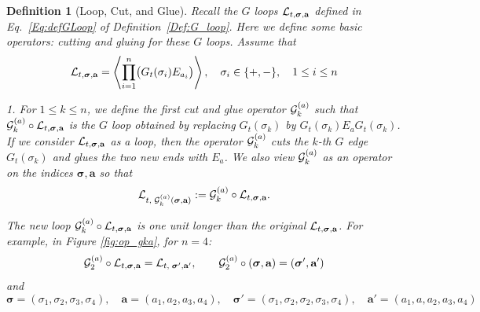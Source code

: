 \documentclass[10pt,reqno]{article}
\theoremstyle{plain} %
\newtheorem{definition}[theorem]{Definition}
\theoremstyle{remark}
\numberwithin{equation}{section}
\begin{document}
 

\begin{definition}[Loop, Cut, and Glue]\label{Def:oper_loop}
Recall the $G$ loops ${\cal L}_{t, \boldsymbol{\sigma}, \textbf{a}}$ defined in Eq.~\eqref{Eq:defGLoop} of Definition~\ref{Def:G_loop}. Here we define some basic operators: cutting and gluing for these $G$ loops.  Assume that
\begin{equation}\label{taahCal}
   {\cal L}_{t, \boldsymbol{\sigma}, \textbf{a}} = \left\langle \prod_{i=1}^n \bigl(G_t(\sigma_i)E_{a_i}\bigr) \right\rangle, \quad \sigma_i \in \{+, -\}, \quad 1 \le i \le n 
\end{equation}
 
 \noindent 
 \emph{1.} 
 For $1 \le k \le n$, we define the first cut and glue operator ${\cal G}^{(a)}_{k}$ such that $
    {\cal G}^{(a)}_{k} \circ {\cal L}_{t, \boldsymbol{\sigma}, \textbf{a}}$  is the $G$ loop obtained by replacing $G_t(\sigma_k)$ by $G_{t}(\sigma_k) E_a G_{t}(\sigma_k)$.
  If we consider ${\cal L}_{t, \boldsymbol{\sigma}, \textbf{a}}$ as a loop, then the operator ${\cal G}^{(a)}_{k}$ cuts the $k$-th $G$ edge $G_t(\sigma_k)$ and glues the two new ends with $E_a$. 
We also view  ${\cal G}_k^{(a)}$  as an operator on the indices $\boldsymbol{\sigma},\textbf{a}$ so that 
    $$
     {\cal L}_{t, \;  {\cal G}^{(a)}_{k} (\boldsymbol{\sigma}, \textbf{a})}
     := {\cal G}^{(a)}_{k} \circ {\cal L}_{t, \boldsymbol{\sigma}, \textbf{a}}.
    $$
    
The new loop ${\cal G}^{(a)}_{k} \circ {\cal L}_{t, \boldsymbol{\sigma}, \textbf{a}}$ is one unit longer than the original ${\cal L}_{t, \boldsymbol{\sigma}, \textbf{a}}$. For example, in Figure \ref{fig:op_gka}, for $n=4$:
    $$
    {\cal G}^{(a)}_{2} \circ {\cal L}_{t, \boldsymbol{\sigma}, \textbf{a}} = {\cal L}_{t, \; \boldsymbol{\sigma}', \textbf{a}'}, 
    \quad\quad 
    {\cal G}^{(a)}_{2} \circ ( \boldsymbol{\sigma}, \textbf{a}) = ( \boldsymbol{\sigma}', \textbf{a}')
    $$
    and 
    $$ \boldsymbol{\sigma}=(\sigma_1,\sigma_2,\sigma_3,\sigma_4),\quad 
   \textbf{a}= (a_1,a_2,a_3,a_4),\quad \boldsymbol{\sigma}' = (\sigma_1, \sigma_2, \sigma_2, \sigma_3, \sigma_4), \quad \textbf{a}' = (a_1, a, a_2, a_3, a_4)
    $$

   \begin{figure}[ht]
        \centering
\end{figure}
\end{definition}
\end{document}
